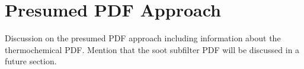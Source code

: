 \section{Presumed PDF Approach}
\label{sec:lesmodels:presumedpdf}

Discussion on the presumed PDF approach including information about the thermochemical PDF. Mention that the soot subfilter PDF will be discussed in a future section.
